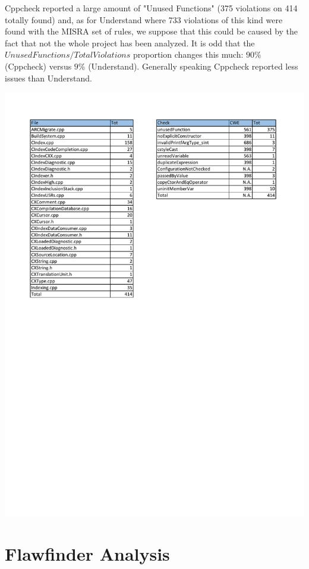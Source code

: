Cppcheck reported a large amount of "Unused Functions" (375 violations on 414 totally found) and, as for Understand where 733 violations of this kind were found with the MISRA set of rules, we suppose that this could be caused by the fact that not the whole project has been analyzed.\newline
It is odd that the $UnusedFunctions/TotalViolations$ proportion changes this much: $90\%$ (Cppcheck) versus $9\%$ (Understand).\newline
Generally speaking Cppcheck reported less issues than Understand.
\pagebreak

\begin{minipage}{\linewidth}
	\includegraphics[width=\textwidth]{pdf/Cppcheck_Summary.pdf}
\end{minipage}

\section{Flawfinder Analysis}

